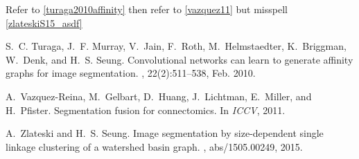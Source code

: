 

Refer to \ref{turaga2010affinity} then refer to \ref{vazquez11} but misspell \ref{zlateskiS15_asdf}

\begin{thebibliography}{}

S.~C. Turaga, J.~F. Murray, V.~Jain, F.~Roth, M.~Helmstaedter, K.~Briggman,
  W.~Denk, and H.~S. Seung.
\newblock Convolutional networks can learn to generate affinity graphs for
  image segmentation.
, 22(2):511--538, Feb. 2010.

A.~Vazquez-Reina, M.~Gelbart, D.~Huang, J.~Lichtman, E.~Miller, and H.~Pfister.
\newblock Segmentation fusion for connectomics.
\newblock In {\em ICCV}, 2011.

A.~Zlateski and H.~S. Seung.
\newblock Image segmentation by size-dependent single linkage clustering of a
  watershed basin graph.
, abs/1505.00249, 2015.

\end{thebibliography}

